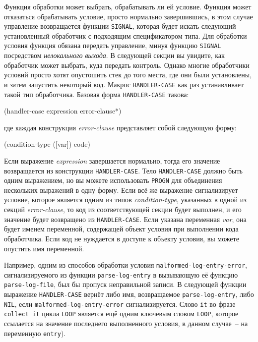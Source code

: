 Функция обработки может выбрать, обрабатывать ли ей условие. Функция может отказаться
обрабатывать условие, просто нормально завершившись, в этом случае управление возвращается
функции \lstinline{SIGNAL}, которая будет искать следующий установленный обработчик с
подходящим спецификатором типа. Для обработки условия функция обязана передать управление,
минуя функцию \lstinline{SIGNAL} посредством \textit{нелокального выхода}. В следующей секции
вы увидите, как обработчик может выбрать, куда передать контроль. Однако многие
обработчики условий просто хотят опустошить стек до того места, где они были установлены,
и затем запустить некоторый код. Макрос \lstinline{HANDLER-CASE} как раз устанавливает такой
тип обработчика. Базовая форма \lstinline{HANDLER-CASE} такова:

\begin{myverb}
(handler-case expression
  error-clause*)
\end{myverb}

\noindent{}где каждая конструкция \textit{error-clause} представляет собой следующую форму:

\begin{myverb}
(condition-type ([var]) code)
\end{myverb}

Если выражение \textit{expression} завершается нормально, тогда его значение возвращается
из конструкции \lstinline{HANDLER-CASE}. Тело \lstinline{HANDLER-CASE} должно быть одним выражением,
но вы можете использовать \lstinline{PROGN} для объединения нескольких выражений в одну
форму. Если всё же выражение сигнализирует условие, которое является одним из типов
\textit{condition-type}, указанных в одной из секций \textit{error-clause}, то код из
соответствующей секции будет выполнен, и его значение будет возвращено из
\lstinline{HANDLER-CASE}. Если указана переменная \textit{var}, она будет именем переменной,
содержащей объект условия при выполнении кода обработчика. Если код не нуждается в доступе
к объекту условия, вы можете опустить имя переменной.

Например, одним из способов обработки условия \lstinline{malformed-log-entry-error},
сигнализируемого из функции \lstinline{parse-log-entry} в вызывающую её функцию
\lstinline{parse-log-file}, был бы пропуск неправильной записи. В следующей функции выражение
\lstinline{HANDLER-CASE} вернёт либо имя, возвращаемое \lstinline{parse-log-entry}, либо \lstinline{NIL},
если \lstinline{malformed-log-entry-error} сигнализируется. Слово \lstinline{it} во фразе
\lstinline{collect it} цикла \lstinline{LOOP} является ещё одним ключевым словом \lstinline{LOOP},
которое ссылается на значение последнего выполненного условия, в данном случае~-- на
переменную \lstinline{entry}).

